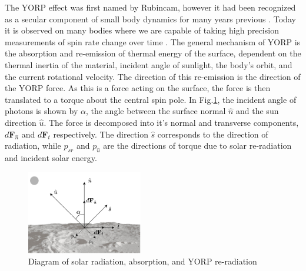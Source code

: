 The YORP effect was first named by Rubincam, however it had been recognized as a secular component of small body dynamics for many years previous \citep{Rubincam2000}. Today it is observed on many bodies where we are capable of taking high precision measurements of spin rate change over time \citep{Lowry2007}. The general mechanism of YORP is the absorption and re-emission of thermal energy of the surface, dependent on the thermal inertia of the material, incident angle of sunlight, the body's orbit, and the current rotational velocity. The direction of this re-emission is the direction of the YORP force. As this is a force acting on the surface, the force is then translated to a torque about the central spin pole. In Fig.\ref{fig:surface_diagram}, the incident angle of photons is shown by $\alpha$, the angle between the surface normal $\hat{n}$ and the sun direction $\hat{u}$. The force is decomposed into it's normal and transverse components, $d\textbf{F}_{\hat{n}}$ and $d\textbf{F}_t$ respectively. The direction $\hat{s}$ corresponds to the direction of radiation, while $p_{sr}$ and $p_{\hat{u}}$ are the directions of torque due to solar re-radiation and incident solar energy. 
\begin{figure}
    \centering
    \includegraphics[width=0.45\textwidth]{fig/yorp.jpeg}
    \caption{Diagram of solar radiation, absorption, and YORP re-radiation}
    \label{fig:surface_diagram}
\end{figure}

